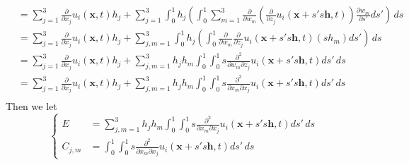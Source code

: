 \begin{equation}
\begin{aligned}
&= \sum_{j=1}^{3}\frac{\partial}{\partial x_j}u_i(\textbf{x},t) h_j
+ \sum_{j=1}^{3}\int_{0}^{1} h_j \left(\int_{0}^{1}\sum_{m=1}^{3}\frac{\partial}{\partial w_m}\left(\frac{\partial}{\partial z_j}u_i(\textbf{x}+s's\textbf{h},t)\right)\frac{\partial w_m}{\partial s'}ds'\right)\,ds\\
&= \sum_{j=1}^{3}\frac{\partial}{\partial x_j}u_i(\textbf{x},t) h_j
+ \sum_{j,m=1}^{3}\int_{0}^{1} h_j \left(\int_{0}^{1}\frac{\partial}{\partial w_m}\frac{\partial}{\partial z_j}u_i(\textbf{x}+s's\textbf{h},t)(sh_m)ds'\right)\,ds\\
&= \sum_{j=1}^{3}\frac{\partial}{\partial x_j}u_i(\textbf{x},t) h_j
+ \sum_{j,m=1}^{3} h_j h_m \int_{0}^{1}\int_{0}^{1}s\frac{\partial^2}{\partial w_m \partial z_j}u_i(\textbf{x}+s's\textbf{h},t)ds'\,ds\\
&= \sum_{j=1}^{3}\frac{\partial}{\partial x_j}u_i(\textbf{x},t) h_j
+ \sum_{j,m=1}^{3} h_j h_m \int_{0}^{1}\int_{0}^{1}s\frac{\partial^2}{\partial x_m \partial x_j}u_i(\textbf{x}+s's\textbf{h},t)ds'\,ds\\
\end{aligned}
\end{equation}
Then we let
\begin{equation}
\left\{\begin{aligned}
E
&= \sum_{j,m=1}^{3} h_j h_m \int_{0}^{1}\int_{0}^{1}s\frac{\partial^2}{\partial x_m \partial x_j}u_i(\textbf{x}+s's\textbf{h},t)ds'\,ds\\
C_{j,m}
&= \int_{0}^{1}\int_{0}^{1}s\frac{\partial^2}{\partial x_m \partial x_j}u_i(\textbf{x}+s's\textbf{h},t)ds'\,ds
\end{aligned}\right.
\end{equation}



